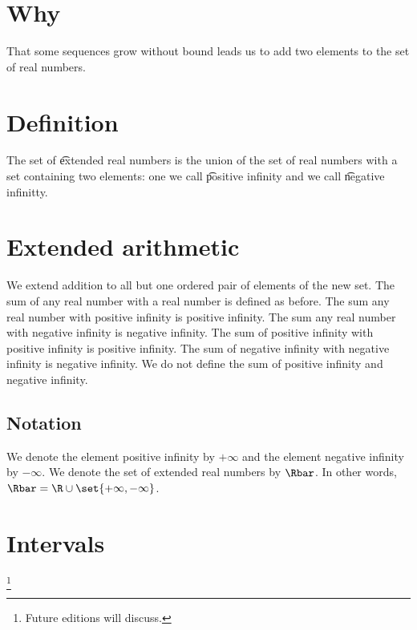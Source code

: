 

\section*{Why}

That some sequences grow without bound leads us to add two elements to the set of real numbers.

\section*{Definition}

The set of \t{extended real numbers} is the union of the set of real numbers with a set containing two elements: one we call \t{positive infinity} and we call \t{negative infinitty}.

\section*{Extended arithmetic}

We extend addition to all
but one ordered pair of elements
of the new set.
The sum of any real number with
a real number is defined as before.
The sum any real number with positive
infinity is positive infinity.
The sum any real number with negative
infinity is negative infinity.
The sum of positive infinity with
positive infinity is positive infinity.
The sum of negative infinity with
negative infinity is negative infinity.
We do not define the sum of
positive infinity and negative infinity.

\subsection*{Notation}

We denote the element positive infinity by $+\infty$ and the element negative infinity by $-\infty$.
We denote the set of extended real numbers by $\Rbar$.
In other words, $\Rbar = \R  \cup \set{+\infty,-\infty}$.

\section*{Intervals}
\footnote{Future editions will discuss.}
\blankpage